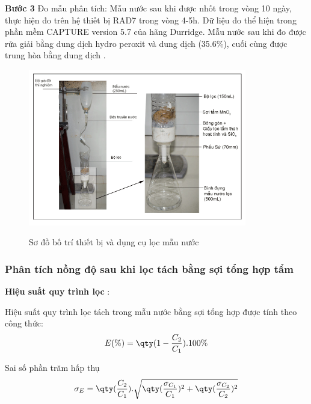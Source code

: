         \textbf{Bước 3} Đo mẫu phân tích:
         Mẫu nước sau khi được nhốt trong vòng 10 ngày, thực hiện đo trên hệ thiết bị RAD7 trong vòng 4-5h. Dữ liệu đo thể hiện trong phần mềm CAPTURE version 5.7 của hãng Durridge.  Mẫu nước sau khi đo được rửa giải bằng dung dịch hydro peroxit và dung dịch  (35.6\%), cuối cùng được trung hòa bằng dung dịch . 
            
       
        \begin{figure}
            \centering
            \caption{Sơ đồ bố trí thiết bị và dụng cụ lọc mẫu nước }
            \includegraphics[width=0.85\textwidth]{Image/MnO2-Figure5.png}
            \label{figure:MnO2SoDoLoc}
        \end{figure}


    \subsubsection{Phân tích nồng độ  sau khi lọc tách bằng sợi tổng hợp tẩm }

         \textbf{Hiệu suất quy trình lọc } :
         
         Hiệu suất quy trình lọc tách  trong mẫu nước bằng  sợi tổng hợp  được tính theo công thức: 
            \begin{equation}
                E (\%) = \qty(1 - \dfrac{C_2}{C_1}).100\%
            \end{equation}

           Sai số phần trăm hấp thụ 
           \begin{equation}
            \sigma_E = \qty(\dfrac{C_2}{C_1}).\sqrt{\qty(\dfrac{\sigma_{C_1}}{C_1})^2+\qty(\dfrac{\sigma_{C_2}}{C_2})^2}
        \end{equation}

